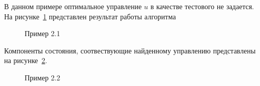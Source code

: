 \documentclass[12pt]{article}
\begin{document}
    В данном примере оптимальное управление $u$ в качестве тестового не задается.
    На рисунке~\ref{img_test_2} представлен результат работы алгоритма

    \begin{figure}[H]
        \centering
        \caption{Пример 2.1}
        \label{img_test_2}
    \end{figure}

    Компоненты состояния, соотвествующие найденному управлению представлены на рисунке~\ref{img_end_state}.
    \begin{figure}[H]
        \centering
        \caption{Пример 2.2}
        \label{img_end_state}
    \end{figure}
\end{document}
